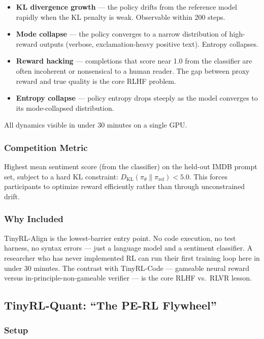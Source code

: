 \begin{itemize}
  \item \textbf{KL divergence growth} --- the policy drifts from the reference model rapidly when the KL penalty is weak. Observable within 200 steps.
  \item \textbf{Mode collapse} --- the policy converges to a narrow distribution of high-reward outputs (verbose, exclamation-heavy positive text). Entropy collapses.
  \item \textbf{Reward hacking} --- completions that score near 1.0 from the classifier are often incoherent or nonsensical to a human reader. The gap between proxy reward and true quality is the core RLHF problem.
  \item \textbf{Entropy collapse} --- policy entropy drops steeply as the model converges to its mode-collapsed distribution.
\end{itemize}

All dynamics visible in under 30 minutes on a single GPU.

\subsubsection*{Competition Metric}

Highest mean sentiment score (from the classifier) on the held-out IMDB prompt set, subject to a hard KL constraint: $D_{\mathrm{KL}}(\pi_\theta \| \pi_{\mathrm{ref}}) < 5.0$. This forces participants to optimize reward efficiently rather than through unconstrained drift.

\subsubsection*{Why Included}

TinyRL-Align is the lowest-barrier entry point. No code execution, no test harness, no syntax errors --- just a language model and a sentiment classifier. A researcher who has never implemented RL can run their first training loop here in under 30 minutes. The contrast with TinyRL-Code --- gameable neural reward versus in-principle-non-gameable verifier --- is the core RLHF vs.\ RLVR lesson.

\subsection{TinyRL-Quant: ``The PE-RL Flywheel''}

\subsubsection*{Setup}

